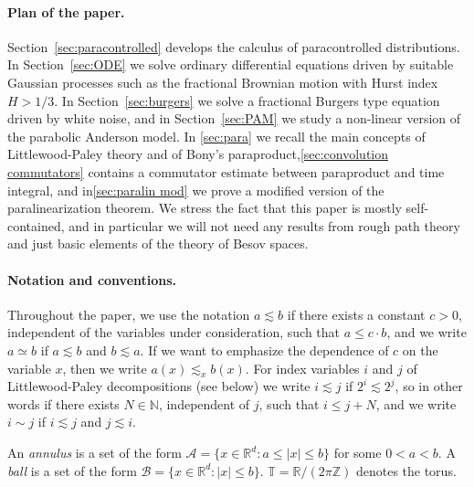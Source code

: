 \documentclass[a4paper,11pt]{article}
\newcommand{\tmem}[1]{{\em #1\/}}
\newcommand{\tmtextit}[1]{{\itshape{#1}}}
\theoremstyle{remark}
\newcommand{\R}{\mathbb{R}}
\newcommand{\Z}{\mathbb{Z}}
\newcommand{\CA}{\ensuremath{\mathscr{A}}}
\newcommand{\CB}{\ensuremath{\mathscr{B}}}
\begin{document}
\paragraph{Plan of the paper.}

Section~\ref{sec:paracontrolled} develops the calculus of paracontrolled distributions. In Section~\ref{sec:ODE} we solve ordinary differential equations driven by suitable Gaussian processes such as the fractional Brownian motion with Hurst index $H>1/3$. In Section~\ref{sec:burgers} we solve a fractional Burgers type equation driven by white noise, and in Section~\ref{sec:PAM} we study a non-linear version of the parabolic Anderson model. %
In \ref{sec:para} we recall the main concepts of Littlewood-Paley theory and of Bony's paraproduct,\ref{sec:convolution commutators} contains a commutator estimate between paraproduct and time integral, and in\ref{sec:paralin mod} we prove a modified version of the paralinearization theorem. We stress the fact that this paper is mostly self-contained, and in particular we will not need any results from rough path theory and just basic elements of the theory of Besov spaces.


\paragraph{Notation and conventions.}%

Throughout the paper, we use the notation $a \lesssim b$ if there exists a constant $c>0$, independent of the variables under consideration, such that $a \leqslant c \cdot b$, and we write $a \simeq b$ if $a \lesssim b$ and $b \lesssim a$. If we want to emphasize the dependence of $c$ on the variable $x$, then we write $a(x) \lesssim_{x} b(x)$. For index variables $i$ and $j$ of Littlewood-Paley decompositions (see below) we write $i \lesssim j$ if $2^i \lesssim 2^j$, so in other words if there exists $N \in \mathbb{N}$, independent of $j$, such that $i \leqslant j +N$, and we write $i \sim j$ if $i \lesssim j$ and $j \lesssim i$.

An \tmtextit{annulus} is a set of the form $\CA = \{ x \in \mathbb{R}^{d} :a \leqslant | x | \leqslant b \}$ for some $0<a<b$. A {\tmem{ball}} is a set of the form $\CB = \{ x \in \mathbb{R}^{d} : | x | \leqslant b \}$. $\mathbb{T}= \R / (2\pi \Z)$ denotes the torus.
\end{document}
